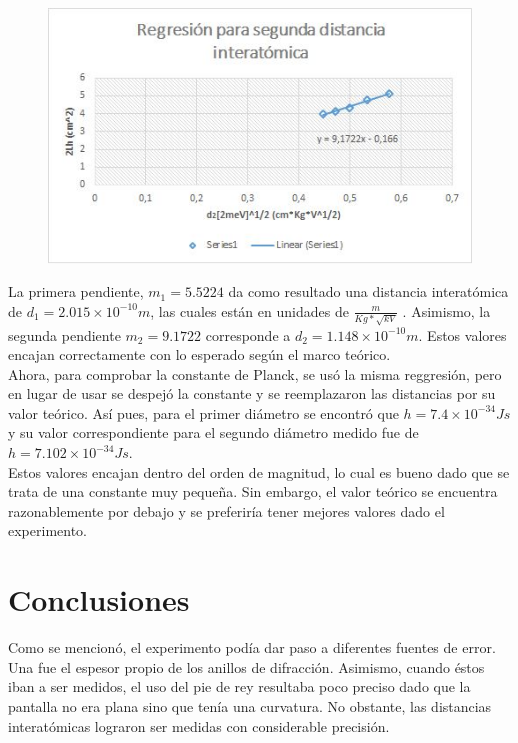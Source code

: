 \documentclass[%
 reprint,
 amsmath,amssymb,
 aps,
]{revtex4-1}
\begin{document}
\begin{figure}[h!]
\centering
\includegraphics[width=0.7\linewidth]{RegD2}
\caption[Regresión lineal para la segunda distancia]{}
\label{fig:reg1}
\end{figure}


La primera pendiente, $ m_1 = 5.5224 $ da como resultado una distancia interatómica de $ d_1 = 2.015 \times 10^{-10} m $, las cuales están en unidades de $ \frac{m}{Kg*\sqrt{kV}} $ . Asimismo, la segunda pendiente $ m_2 = 9.1722 $ corresponde a $ d_2 = 1.148 \times 10^{-10} m $. Estos valores encajan correctamente con lo esperado según el marco teórico.\\

Ahora, para comprobar la constante de Planck, se usó la misma reggresión, pero en lugar de usar se despejó la constante y se reemplazaron las distancias por su valor teórico. Así pues, para el primer diámetro se encontró que $ h = 7.4 \times 10^{-34} Js$ y su valor correspondiente para el segundo diámetro medido fue de $ h=7.102 \times 10^{-34} Js $. \\

Estos valores encajan dentro del orden de magnitud, lo cual es bueno dado que se trata de una constante muy pequeña. Sin embargo, el valor teórico se encuentra razonablemente por debajo y se preferiría tener mejores valores dado el experimento. \\

\section{\label{sec:level1}Conclusiones}

Como se mencionó, el experimento podía dar paso a diferentes fuentes de error. Una fue el espesor propio de los anillos de difracción. Asimismo, cuando éstos iban a ser medidos, el uso del pie de rey resultaba poco preciso dado que la pantalla no era plana sino que tenía una curvatura. No obstante, las distancias interatómicas lograron ser medidas con considerable precisión.\\
\end{document}
